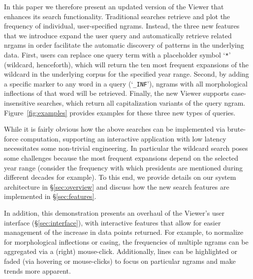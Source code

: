 \documentclass[11pt]{article}
\begin{document}
In this paper we therefore present an updated version of the Viewer that enhances its search functionality. Traditional searches retrieve and plot the frequency of individual, user-specified ngrams. Instead, the three new features that we introduce expand the user query and automatically retrieve related nrgams in order facilitate the automatic discovery of patterns in the underlying data. First, users can replace one query term with a placeholder symbol `\texttt{*}' (wildcard, henceforth), which will return the ten most frequent expansions of the wildcard in the underlying corpus for the specified year range. 
Second, by adding a specific marker to any word in a query (`\texttt{\_INF}'), ngrams with all morphological inflections of that word will be retrieved. 
Finally, the new Viewer supports case-insensitive searches, which return all capitalization variants of the query ngram. Figure~\ref{fig:examples} provides examples for these three new types of queries.

While it is fairly obvious how the above searches can be implemented via brute-force computation, supporting an interactive application with low latency necessitates some non-trivial engineering. In particular the wildcard search poses some challenges because the most frequent expansions depend on the selected year range (consider the frequency with which presidents are mentioned during different decades for example). To this end, we provide details on our system architecture in \S\ref{sec:overview}  and discuss how the new search features are implemented in \S\ref{sec:features}.

In addition, this demonstration presents an overhaul of the Viewer's user interface (\S\ref{sec:interface}), with interactive features that allow for easier management of the increase in data points returned. For example, to normalize for morphological inflections or casing, the frequencies of multiple ngrams can be aggregated via a (right) mouse-click. Additionally, lines can be highlighted or faded (via hovering or mouse-clicks) to focus on particular ngrams and make trends more apparent.
\end{document}
